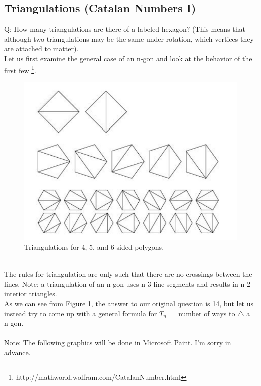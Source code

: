 \subsection{Triangulations (Catalan Numbers I)}
Q: How many triangulations are there of a labeled hexagon? (This means that although two triangulations may be the same under rotation, which vertices they are attached to matter).\\
Let us first examine the general case of an n-gon and look at the behavior of the first few \footnote{http://mathworld.wolfram.com/CatalanNumber.html}.\\
\begin{figure}
  \includegraphics[width=\linewidth]{figures/polygons.jpg}
  \caption{Triangulations for 4, 5, and 6 sided polygons.}
  \label{fig:triangs1}
\end{figure}\\
The rules for triangulation are only such that there are no crossings between the lines. Note: a triangulation of an n-gon uses n-3 line segments and results in n-2 interior triangles.\\
As we can see from Figure 1, the answer to our original question is 14, but let us instead try to come up with a general formula for $T_n = $ number of ways to $\triangle$ a n-gon.\\
\\
Note: The following graphics will be done in Microsoft Paint. I'm sorry in advance.\\


